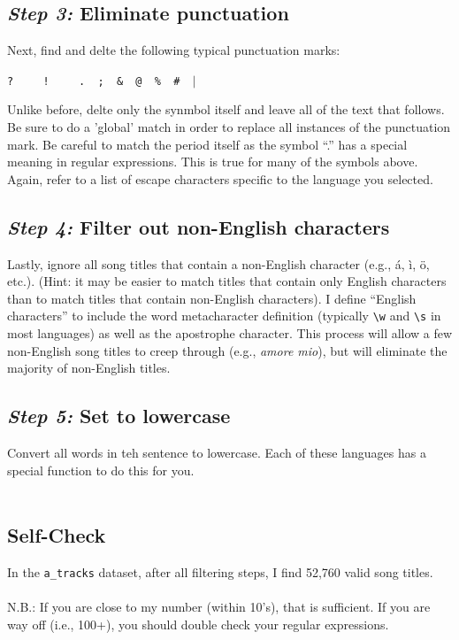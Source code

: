 \documentclass{article}
\begin{document}
\subsection*{\textit{Step 3:} Eliminate punctuation}
Next, find and delte the following typical punctuation marks:
\begin{center}
 \verb|?  | \textquestiondown \verb|  !  | \textexclamdown \verb|  .  ;  &  @  %  #  |$\vert$
\end{center}

\noindent Unlike before, delte only the synmbol itself and leave all of the text that follows. Be sure to do a 'global' match in order to replace all instances of the punctuation mark. Be careful to match the period itself as the symbol ``.'' has a special meaning in regular expressions. This is true for many of the symbols above. Again, refer to a list of escape characters specific to the language you selected.

\subsection*{\textit{Step 4:} Filter out non-English characters}
Lastly, ignore all song titles that contain a non-English character (e.g., \'{a}, \`{i}, \"{o}, etc.). (Hint: it may be easier to match titles that contain only English characters than to match titles that contain non-English characters). I define ``English characters'' to include the word metacharacter definition (typically \verb|\w| and \verb|\s| in most languages) as well as the apostrophe character. This process will allow a few non-English song titles to creep through (e.g., \textit{amore mio}), but will eliminate the majority of non-English titles.

\subsection*{\textit{Step 5:} Set to lowercase}
Convert all words in teh sentence to lowercase. Each of these languages has a special function to do this for you.
\\\\
\begin{tcolorbox}
 \section*{Self-Check}
 In the \verb|a_tracks| dataset, after all filtering steps, I find 52,760 valid song titles.
 \\\\
 N.B.: If you are close to my number (within 10's), that is sufficient. If you are way off (i.e., 100+), you should double check your regular expressions.
 
\end{tcolorbox}
\end{document}
